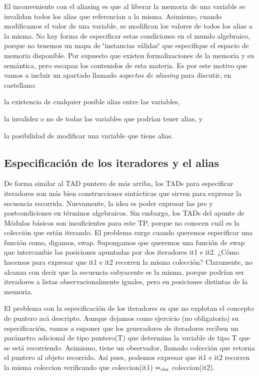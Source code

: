 El inconveniente con el aliasing es que al liberar la memoria de una variable se invalidan todos los alias que referencian a la misma. Asimismo, cuando modificamos el valor de una variable, se modifican los valores de todos los alias a la misma. No hay forma de especificar estas condiciones en el mundo algebraico, porque no tenemos un mapa de \char`\"{}instancias válidas\char`\"{} que especifique el espacio de memoria disponible. Por supuesto que existen formalizaciones de la memoria y su semántica, pero escapan los contenidos de esta materia. Es por este motivo que vamos a incluir un apartado llamado {\itshape aspectos de aliasing} para discutir, en castellano\-:
\begin{DoxyItemize}
\item la existencia de cualquier posible alias entre las variables,
\item la invalidez o no de todas las variables que podrían tener alias, y
\item la posibilidad de modificar una variable que tiene alias.
\end{DoxyItemize}\hypertarget{Aliasing_sec-iteradores}{}\subsection{Especificación de los iteradores y el alias}\label{Aliasing_sec-iteradores}
De forma similar al T\-A\-D puntero de más arriba, los T\-A\-Ds para especificar iteradores son más bien construcciones sintácticas que sirven para expresar la secuencia recorrida. Nuevamente, la idea es poder expresar las pre y postcondiciones en términos algebraicos. Sin embargo, los T\-A\-Ds del apunte de Módulos básicos son insuficientes para este T\-P, porque no conocen cuál es la colección que están iterando. El problema surge cuando queremos especificar una función como, digamos, swap. Supongamos que queremos una función de swap que intercambie las posiciones apuntadas por dos iteradores {\ttfamily it1} e {\ttfamily it2}. ¿\-Cómo hacemos para expresar que {\ttfamily it1} e {\ttfamily it2} recorren la misma colección? Claramente, no alcanza con decir que la secuencia subyacente es la misma, porque podrían ser iteradores a listas observacionalmente iguales, pero en posiciones distintas de la memoria.

El problema con la especificación de los iteradores es que no explotan el concepto de puntero acá descripto. Aunque dejamos como ejercicio (no obligatorio) su especificación, vamos a suponer que los generadores de iteradores reciben un parámetro adicional de tipo puntero(\-T) que determina la variable de tipo T que se está recorriendo. Asimismo, tiene un observador, llamado colección que retorna el puntero al objeto recorrido. Así pues, podemos expresar que {\ttfamily it1} e {\ttfamily it2} recorren la misma coleccion verificando que coleccion({\ttfamily it1}) $=_{\rm obs}$ coleccion({\ttfamily it2}). 